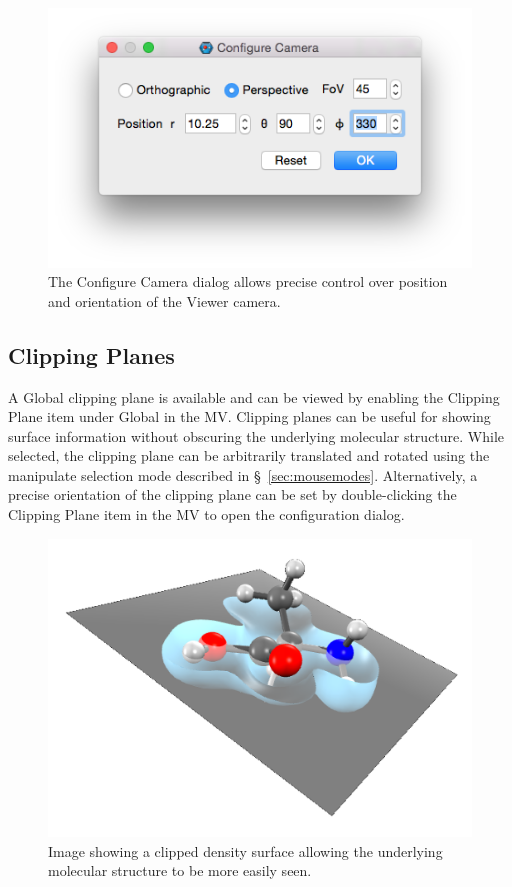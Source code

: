 \documentclass[a4paper,12pt]{article}
\begin{document}
\begin{figure}[h]
\begin{center}
\includegraphics[scale=0.25]{figures/CameraDialog.png}
\caption{The Configure Camera dialog allows precise control over position and orientation
of the Viewer camera.}
\end{center}
\end{figure}



\subsection{Clipping Planes}

A Global clipping plane is available and can be viewed by enabling the Clipping
Plane item under Global in the MV.  Clipping planes can be useful for showing
surface information without obscuring the underlying molecular structure.
While selected, the clipping plane can be arbitrarily translated and rotated
using the manipulate selection mode described in \S\ \ref{sec:mousemodes}.
Alternatively, a precise orientation of the clipping plane can be set by
double-clicking the Clipping Plane item in the MV to open the configuration
dialog.

\begin{figure}[h]
\begin{center}
\includegraphics[scale=0.30]{figures/ClippingPlane.png}
\caption{Image showing a clipped density surface allowing the underlying
molecular structure to be more easily seen.} 
\end{center}
\end{figure}
\end{document}
